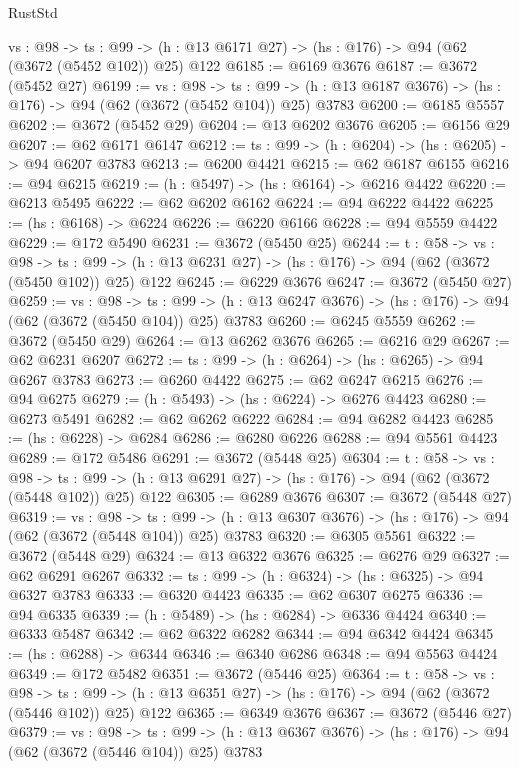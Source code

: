 \begin{lexlean}{RustStd}
\begin{coremodule}
{\begin{coremodule}
{{{{{{{{{{{  {vs : @98} ->
  {ts : @99} -> (h : @13 @6171 @27) -> (hs : @176) -> @94 (@62 (@3672 (@5452 @102)) @25) @122
@6185 := @6169 @3676
@6187 := @3672 (@5452 @27)
@6199 := {vs : @98} ->
  {ts : @99} -> (h : @13 @6187 @3676) -> (hs : @176) -> @94 (@62 (@3672 (@5452 @104)) @25) @3783
@6200 := @6185 @5557
@6202 := @3672 (@5452 @29)
@6204 := @13 @6202 @3676
@6205 := @6156 @29
@6207 := @62 @6171 @6147
@6212 := {ts : @99} -> (h : @6204) -> (hs : @6205) -> @94 @6207 @3783
@6213 := @6200 @4421
@6215 := @62 @6187 @6155
@6216 := @94 @6215
@6219 := (h : @5497) -> (hs : @6164) -> @6216 @4422
@6220 := @6213 @5495
@6222 := @62 @6202 @6162
@6224 := @94 @6222 @4422
@6225 := (hs : @6168) -> @6224
@6226 := @6220 @6166
@6228 := @94 @5559 @4422
@6229 := @172 @5490
@6231 := @3672 (@5450 @25)
@6244 := {t : @58} ->
  {vs : @98} ->
  {ts : @99} -> (h : @13 @6231 @27) -> (hs : @176) -> @94 (@62 (@3672 (@5450 @102)) @25) @122
@6245 := @6229 @3676
@6247 := @3672 (@5450 @27)
@6259 := {vs : @98} ->
  {ts : @99} -> (h : @13 @6247 @3676) -> (hs : @176) -> @94 (@62 (@3672 (@5450 @104)) @25) @3783
@6260 := @6245 @5559
@6262 := @3672 (@5450 @29)
@6264 := @13 @6262 @3676
@6265 := @6216 @29
@6267 := @62 @6231 @6207
@6272 := {ts : @99} -> (h : @6264) -> (hs : @6265) -> @94 @6267 @3783
@6273 := @6260 @4422
@6275 := @62 @6247 @6215
@6276 := @94 @6275
@6279 := (h : @5493) -> (hs : @6224) -> @6276 @4423
@6280 := @6273 @5491
@6282 := @62 @6262 @6222
@6284 := @94 @6282 @4423
@6285 := (hs : @6228) -> @6284
@6286 := @6280 @6226
@6288 := @94 @5561 @4423
@6289 := @172 @5486
@6291 := @3672 (@5448 @25)
@6304 := {t : @58} ->
  {vs : @98} ->
  {ts : @99} -> (h : @13 @6291 @27) -> (hs : @176) -> @94 (@62 (@3672 (@5448 @102)) @25) @122
@6305 := @6289 @3676
@6307 := @3672 (@5448 @27)
@6319 := {vs : @98} ->
  {ts : @99} -> (h : @13 @6307 @3676) -> (hs : @176) -> @94 (@62 (@3672 (@5448 @104)) @25) @3783
@6320 := @6305 @5561
@6322 := @3672 (@5448 @29)
@6324 := @13 @6322 @3676
@6325 := @6276 @29
@6327 := @62 @6291 @6267
@6332 := {ts : @99} -> (h : @6324) -> (hs : @6325) -> @94 @6327 @3783
@6333 := @6320 @4423
@6335 := @62 @6307 @6275
@6336 := @94 @6335
@6339 := (h : @5489) -> (hs : @6284) -> @6336 @4424
@6340 := @6333 @5487
@6342 := @62 @6322 @6282
@6344 := @94 @6342 @4424
@6345 := (hs : @6288) -> @6344
@6346 := @6340 @6286
@6348 := @94 @5563 @4424
@6349 := @172 @5482
@6351 := @3672 (@5446 @25)
@6364 := {t : @58} ->
  {vs : @98} ->
  {ts : @99} -> (h : @13 @6351 @27) -> (hs : @176) -> @94 (@62 (@3672 (@5446 @102)) @25) @122
@6365 := @6349 @3676
@6367 := @3672 (@5446 @27)
@6379 := {vs : @98} ->
  {ts : @99} -> (h : @13 @6367 @3676) -> (hs : @176) -> @94 (@62 (@3672 (@5446 @104)) @25) @3783
}}}}}}}}}}}
\end{coremodule}}
\end{coremodule}
\end{lexlean}
